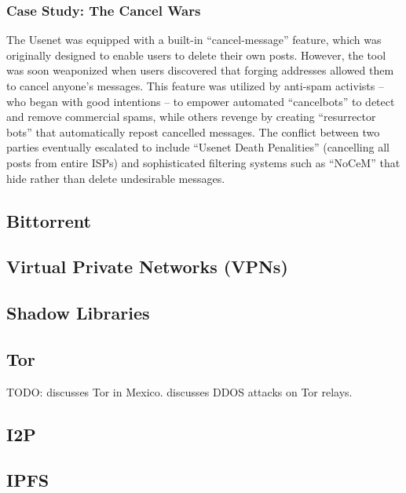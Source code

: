 \subsubsection{Case Study: The Cancel Wars}
The Usenet was equipped with a built-in ``cancel-message'' feature, which was
originally designed to enable users to delete their own posts. However, the tool
was soon weaponized when users discovered that forging addresses allowed them to
cancel anyone's messages. This feature was utilized by anti-spam activists --
who began with good intentions -- to empower automated ``cancelbots'' to detect
and remove commercial spams, while others revenge by creating ``resurrector
bots'' that automatically repost cancelled messages. The conflict between two
parties eventually escalated to include ``Usenet Death Penalities'' (cancelling
all posts from entire ISPs) and sophisticated filtering systems such as
``NoCeM'' that hide rather than delete undesirable messages.



\cite{HowUseUsenet,ohmRegulatingInternetUsenet1998}

\subsection{Bittorrent}

\subsection{Virtual Private Networks (VPNs)}

\subsection{Shadow Libraries}

\subsection{Tor}

TODO: \cite{iszaevichDistributedDetectionTor2019} discusses Tor in Mexico.
\cite{hollerCaseStudyDDoS2024} discusses DDOS attacks on Tor relays.

\subsection{I2P}

\subsection{IPFS}
